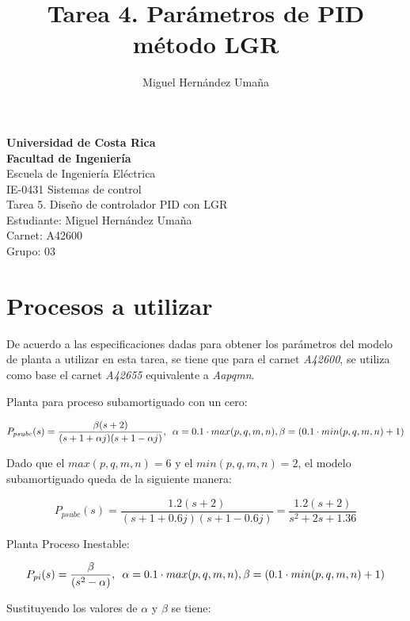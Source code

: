 \documentclass{report}
\title{Tarea 4. Parámetros de PID método LGR}
\author{Miguel Hernández Umaña}
\begin{document}
\pagestyle{empty} 
\begin{center}
\textbf{{\Large Universidad de Costa Rica}\\}
\textbf{{\Large Facultad de Ingeniería}\\}
{\large Escuela de Ingeniería Eléctrica}\\
IE-0431 Sistemas de control\\
\vspace{60 mm}
Tarea 5. Diseño de controlador PID con LGR\\

\vfill
Estudiante: Miguel Hernández Umaña \\
Carnet: A42600\\
Grupo: 03\\



\thispagestyle{empty} 
\end{center}
 \newpage
\section*{Procesos a utilizar}
De acuerdo a las especificaciones dadas para obtener los parámetros del 
modelo de planta a utilizar en esta tarea, se tiene que para el carnet \textit{A42600}, 
se utiliza como base el carnet \textit{A42655} equivalente a \textit{Aapqmn}.

Planta para proceso subamortiguado con un cero:

\begin{equation*}
    P_{psubc}(s) = \frac{\beta(s+2)}{(s+1+\alpha j)(s+1-\alpha j)},\enskip \alpha = 0.1 \cdot max(p,q,m,n), \beta = 
    (0.1 \cdot min(p,q,m,n)+1)
\label{Eq:1}
\end{equation*}

Dado que el \(max(p,q,m,n) = 6\) y el \(min(p,q,m,n) = 2\), el modelo subamortiguado queda de la siguiente manera:

\begin{equation*}
    P_{psubc}(s) = \frac{1.2(s+2)}{(s+1+0.6 j)(s+1-0.6 j)} = \frac{1.2(s+2)}{s^2+2s+1.36} 
\label{Eq:2}
\end{equation*}

Planta Proceso Inestable:

\begin{equation*}
    P_{pi}(s) = \frac{\beta}{(s^2-\alpha)},\enskip \alpha = 0.1 \cdot max(p,q,m,n), \beta = (0.1 \cdot min(p,q,m,n)+1) 
\label{Eq:3}
\end{equation*}

Sustituyendo los valores de \(\alpha\) y \(\beta\) se tiene:
\end{document}
